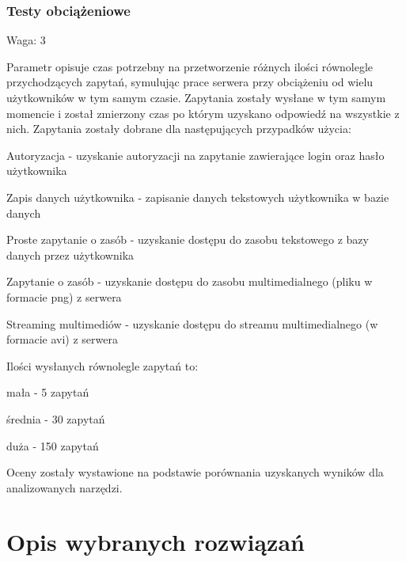 \documentclass[12pt]{report}
\begin{document}
    \subsection{Testy obciążeniowe}
      \begin{description}
        \item Waga: 3
      \end{description}
      Parametr opisuje czas potrzebny na przetworzenie różnych ilości równolegle przychodzących zapytań, symulując prace serwera przy obciążeniu od wielu użytkowników w tym samym czasie.
      Zapytania zostały wysłane w tym samym momencie i został zmierzony czas po którym uzyskano odpowiedź na wszystkie z nich.
      Zapytania zostały dobrane dla następujących przypadków użycia:
      \begin{description}
        \item Autoryzacja - uzyskanie autoryzacji na zapytanie zawierające login oraz hasło użytkownika
        \item Zapis danych użytkownika - zapisanie danych tekstowych użytkownika w bazie danych
        \item Proste zapytanie o zasób - uzyskanie dostępu do zasobu tekstowego z bazy danych przez użytkownika
        \item Zapytanie o zasób - uzyskanie dostępu do zasobu multimedialnego (pliku w formacie png) z serwera
        \item Streaming multimediów - uzyskanie dostępu do streamu multimedialnego (w formacie avi) z serwera
      \end{description}
      Ilości wysłanych równolegle zapytań to:
      \begin{description}
        \item mała - 5 zapytań
        \item średnia - 30 zapytań
        \item duża - 150 zapytań
      \end{description}
      Oceny zostały wystawione na podstawie porównania uzyskanych wyników dla analizowanych narzędzi.

\chapter{Opis wybranych rozwiązań}
\end{document}
